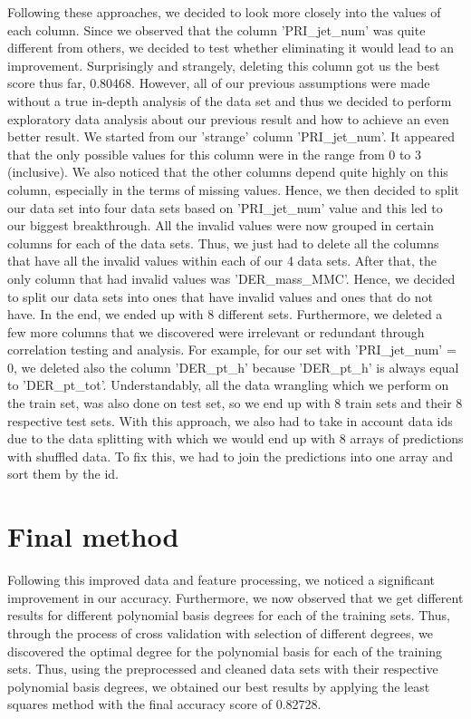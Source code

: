 \documentclass[10pt,conference,compsocconf]{IEEEtran}
\begin{document}
Following these approaches, we decided to look more closely into the values of each column. Since we observed that the column 'PRI\_jet\_num' was quite different from others, we decided to test whether eliminating it would lead to an improvement. Surprisingly and strangely, deleting this column got us the best score thus far, 0.80468. However, all of our previous assumptions were made without a true in-depth analysis of the data set and thus we decided to perform exploratory data analysis about our previous result and how to achieve an even better result. We started from our 'strange' column 'PRI\_jet\_num'. It appeared that the only possible values for this column were in the range from 0 to 3 (inclusive). We also noticed that the other columns depend quite highly on this column, especially in the terms of missing values. Hence, we then decided to split our data set into four data sets based on 'PRI\_jet\_num' value and this led to our biggest breakthrough. All the invalid values were now grouped in certain columns for each of the data sets. Thus, we just had to delete all the columns that have all the invalid values within each of our 4 data sets. After that, the only column that had invalid values was 'DER\_mass\_MMC'. Hence, we decided to split our data sets into ones that have invalid values and ones that do not have. In the end, we ended up with 8 different sets. Furthermore, we deleted a few more columns that we discovered were irrelevant or redundant through correlation testing and analysis. For example, for our set with 'PRI\_jet\_num' = 0, we deleted also the column 'DER\_pt\_h' because 'DER\_pt\_h' is always equal to 'DER\_pt\_tot'. Understandably, all the data wrangling which we perform on the train set, was also done on test set, so we end up with 8 train sets and their 8 respective test sets. With this approach, we also had to take in account data ids due to the data splitting with which we would end up with 8 arrays of predictions with shuffled data. To fix this, we had to join the predictions into one array and sort them by the id.

\section{Final method}

Following this improved data and feature processing, we noticed a significant improvement in our accuracy. Furthermore, we now observed that we get different results for different polynomial basis degrees for each of the training sets. Thus, through the process of cross validation with selection of different degrees, we discovered the optimal degree for the polynomial basis for each of the training sets. Thus, using the preprocessed and cleaned data sets with their respective polynomial basis degrees, we obtained our best results by applying the least squares method with the final accuracy score of 0.82728.
\end{document}
